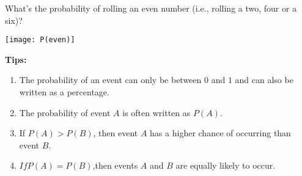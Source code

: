 \documentclass{article}
\begin{document}
\noindent What’s the probability of rolling an even number (i.e., rolling a two, four or a six)?\\
\begin{center}
	\texttt{[image: P(even)]}
\end{center}

\noindent \textbf{Tips:}\\
\begin{enumerate}
	\item The probability of an event can only be between $0$ and $1$ and can also be written as a percentage.
	\item The probability of event $A$ is often written as $P(A)$.
	\item If $P(A) > P(B)$, then event $A$ has a higher chance of occurring than event $B$.
	\item $If P(A) = P(B)$,then events $A$ and $B$ are equally likely to occur.
\end{enumerate}
\end{document}

